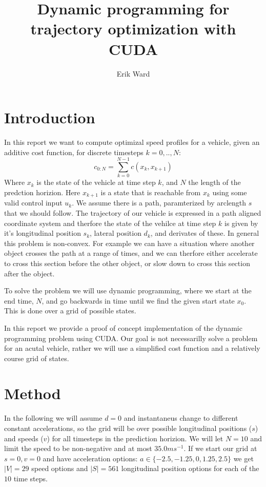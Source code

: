 \documentclass[a4paper,10pt,twocolumn]{article}
\title{Dynamic programming for trajectory optimization with CUDA}
\author{Erik Ward}
\begin{document}
\maketitle

\section{Introduction}

In this report we want to compute optimizal speed profiles
for a vehicle, given an additive cost function, for discrete timesteps
$k=0,..,N$:
$$
c_{0:N} = \sum_{k=0}^{N-1} c(x_k,x_{k+1})
$$
Where $x_k$ is the state of the vehicle at time step $k$, and $N$ the
length of the predction horizion. Here $x_{k+1}$ is a state that 
is reachable from $x_k$ using some valid control input $u_k$.
We assume there is a path,
paramterized by arclength $s$ that we should follow.  The trajectory
of our vehicle is expressed in a path aligned coordinate system and
therfore the state of the vehilce at time step $k$ is given by it's
longitudinal position $s_k$, lateral position $d_k$, and derivates of
these.  In general this problem is non-convex. For example we can have
a situation where another object crosses the path at a range of times,
and we can therfore either accelerate to cross this section before the
other object, or slow down to cross this section after the object.

To solve the problem we will use dynamic programming, where we start
at the end time, $N$, and go backwards in time until we 
find the given start state $x_0$. This is done over a grid of
possible states. 

In this report we provide a proof of concept implementation of 
the dynamic programming problem using CUDA. Our goal is 
not necessarilly solve a problem for an acutal vehicle, rather
we will use a simplified cost function and a relatively course 
grid of states.

\section{Method}

In the following we will assume $d=0$ and instantaneus 
change to different constant accelerations, so the grid will be over
possible longitudinal positions ($s$) and speeds ($v$) for all 
timesteps in the prediction horizion. We will let $N = 10$ and limit the 
speed to be non-negative and at most $35.0 ms^{-1}$. If we start 
our grid at $s=0,v=0$ and have acceleration options:
$a \in \{-2.5,-1.25,0,1.25,2.5\}$ we get $|V|=29$ speed options and $|S|=561$ 
longitudinal position options for each of the $10$ time steps.
\end{document}
